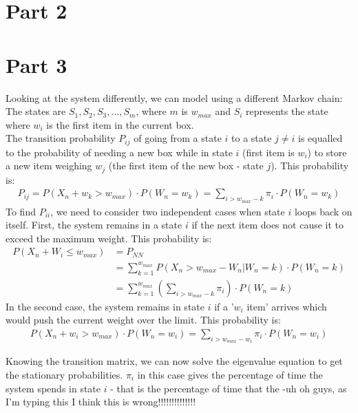 \documentclass[10pt,a4paper]{article}
\begin{document}
\section{Part 2}



\section{Part 3}
Looking at the system differently, we can model using a different Markov chain:\\
The states are $ S_1, S_2, S_3, ..., S_m$, where $m$ is $w_{max}$ and $S_i$ represents the state where $w_i$ is the first item in the current box.\\

The transition probability $P_{ij}$ of going from a state $i$ to a state $j\neq i$ is equalled to the probability of needing a new box while in state $i$ (first item is $w_i$) to store a new item weighing $w_j$ (the first item of the new box - state $j$). This probability is:\\
\begin{align*}
P_{ij}= P(X_n + w_k > w_{max}) \cdot P( W_n = w_k)= \sum_{i > w_{max} -k} \pi_i \cdot P( W_n = w_k)
\end{align*}
To find $P_{ii}$, we need to consider two independent cases when state $i$ loops back on itself. First, the system remains in a state $i$ if the next item does not cause it to exceed the maximum weight. This probability is:\\
\begin{align*}
P(X_n + W_i \leq w_{max}) &= P_{NN} \\
&= \sum\limits_{k=1}^{w_{max}} P(X_n > w_{max} -W_n | W_n=k)\cdot P(W_n=k) \\
&= \sum\limits_{k=1}^{w_{max}} \left( \sum_{i > w_{max} -k} \pi_i \right) \cdot P(W_n=k)
\end{align*}
In the second case, the system remains in state $i$ if a '$w_i$ item' arrives which would push the current weight over the limit. This probability is:\\
\begin{align*}
P( X_n + w_i > w_{max}) \cdot P( W_n = w_i) =\sum_{i > w_{max} -w_i} \pi_i \cdot P( W_n = w_i)
\end{align*}

Knowing the transition matrix, we can now solve the eigenvalue equation to get the stationary probabilities. $\pi_i$ in this case gives the percentage of time the system spends in state $i$ - that is the percentage of time that the -uh oh guys, as I'm typing this I think this is wrong!!!!!!!!!!!!!!
\end{document}

